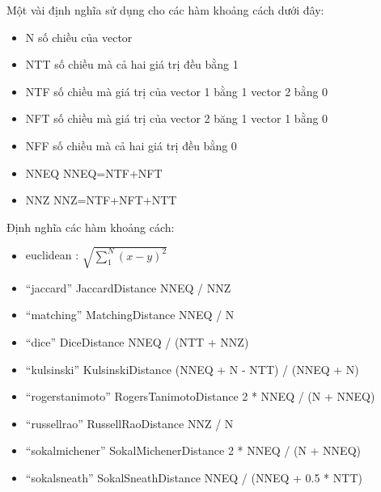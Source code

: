 \documentclass[a4paper,12pt]{report}
\begin{document}
Một vài định nghĩa sử dụng cho các hàm khoảng cách dưới đây:
\begin{itemize}
\item N số chiều của vector
\item NTT số chiều mà cả hai giá trị đều bằng 1
\item NTF số chiều mà giá trị của vector 1 bằng 1 vector 2 bằng 0
\item NFT số chiều mà giá trị của vector 2 băng 1 vector 1 bằng 0
\item NFF số chiều mà cả hai giá trị đều bằng 0
\item NNEQ NNEQ=NTF+NFT
\item NNZ NNZ=NTF+NFT+NTT 
\end{itemize}
Định nghĩa các hàm khoảng cách:
\begin{itemize}
\item euclidean : $\sqrt{\sum_1^N (x-y)^2}$
\item “jaccard”	JaccardDistance	NNEQ / NNZ
\item “matching”	MatchingDistance	NNEQ / N
\item “dice”	DiceDistance	NNEQ / (NTT + NNZ)
\item “kulsinski”	KulsinskiDistance	(NNEQ + N - NTT) / (NNEQ + N)\item “rogerstanimoto”	RogersTanimotoDistance	2 * NNEQ / (N + NNEQ)
\item “russellrao”	RussellRaoDistance	NNZ / N
\item “sokalmichener”	SokalMichenerDistance	2 * NNEQ / (N + NNEQ)
\item “sokalsneath”	SokalSneathDistance	NNEQ / (NNEQ + 0.5 * NTT)
\end{itemize}
\begin{thebibliography}{9}


\end{thebibliography}
\end{document}
